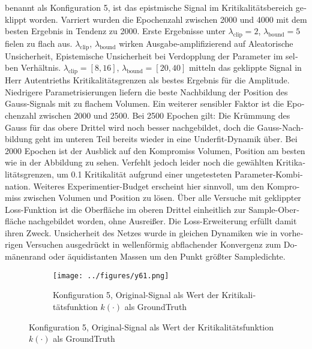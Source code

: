 \begin{otherlanguage}{ngerman}
benannt als Konfiguration 5, ist das epistmische Signal im Kritikalitätsbereich geklippt worden. Varriert wurden die Epochenzahl zwischen 2000 und 4000 mit dem besten Ergebnis in Tendenz zu 2000. Erste Ergebnisse unter $\lambda_{\text{clip}}=2$, $\lambda_{\text{bound}}=5$ fielen zu flach aus. $\lambda_{\text{clip}}$, $\lambda_{\text{bound}}$ wirken Ausgabe-amplifizierend auf \gls{Aleatorische Unsicherheit}, \gls{Epistemische Unsicherheit} bei Verdopplung der Parameter im selben Verhältnis. $\lambda_{\text{clip}}=[8, 16]$, $\lambda_{\text{bound}}=[20, 40]$ mitteln das geklippte Signal in Herr Autentrieths Kritikalitätsgrenzen als bestes Ergebnis für die Amplitude. Niedrigere Parametrisierungen liefern die beste Nachbildung der Position des Gauss-Signals mit zu flachem Volumen. Ein weiterer sensibler Faktor ist die Epochenzahl zwischen 2000 und 2500. Bei 2500 Epochen gilt: Die Krümmung des Gauss für das obere Drittel wird noch besser nachgebildet, doch die Gauss-Nachbildung geht im unteren Teil bereits wieder in eine Underfit-Dynamik über. Bei 2000 Epochen ist der Ausblick auf den Kompromiss Volumen, Position am besten wie in der Abbildung zu sehen. Verfehlt jedoch leider noch die gewählten Kritikalitätsgrenzen, um 0.1 Kritikalität aufgrund einer ungetesteten Parameter-Kombination. Weiteres Experimentier-Budget erscheint hier sinnvoll, um den Kompromiss zwischen Volumen und Position zu lösen. Über alle Versuche mit geklippter Loss-Funktion ist die Oberfläche im oberen Drittel einheitlich zur Sample-Oberfläche nachgebildet worden, ohne Ausreißer. Die Loss-Erweiterung erfüllt damit ihren Zweck. Unsicherheit des Netzes wurde in gleichen Dynamiken wie in vorherigen Versuchen ausgedrückt in wellenförmig abflachender Konvergenz zum Domänenrand oder äquidistanten Massen um den Punkt größter Sampledichte.


\begin{figure}[!ht]
  \centering

  \begin{subfigure}[t]{\textwidth}
    \centering
    \texttt{[image: ../figures/y61.png]}
    \caption{Konfiguration 5, Original-Signal als Wert der Kritikalitätsfunktion \(k(\cdot)\) als \gls{GroundTruth}}
    \label{fig:bild31}
  \end{subfigure}



\end{figure}
\end{otherlanguage}
